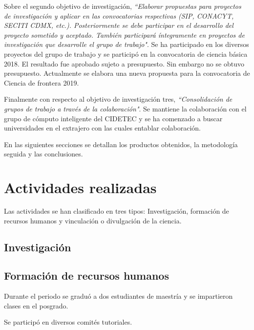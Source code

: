 \documentclass[]{article}
\begin{document}
Sobre el segundo objetivo de investigación, \textit{``Elaborar propuestas para proyectos de investigación y aplicar en las convocatorias respectivas (SIP, CONACYT, SECITI CDMX, etc.). Posteriormente se debe participar en el desarrollo del proyecto sometido y aceptado. También participará íntegramente en proyectos de investigación que desarrolle el grupo de trabajo"}\cite{anexo2actualizado}.  Se ha participado en los diversos proyectos del grupo de trabajo y se participó en la convocatoria de ciencia básica 2018. El resultado fue aprobado sujeto a presupuesto. Sin embargo no se obtuvo presupuesto. Actualmente se elabora una nueva propuesta para la convocatoria de Ciencia de frontera 2019.

Finalmente con respecto al objetivo de investigación tres, \textit{``Consolidación de grupos de trabajo a través de la colaboración"}\cite{anexo2actualizado}. Se mantiene la colaboración con el grupo de cómputo inteligente del CIDETEC y se ha comenzado a buscar universidades en el extrajero con las cuales entablar colaboración. 

En las siguientes secciones se detallan los productos obtenidos, la metodología seguida y las conclusiones.


\section{Actividades realizadas}
\label{sec:actividades}
	


Las actividades se han clasificado en tres tipos: Investigación, formación de recursos humanos y vinculación o divulgación de la ciencia.
	
\subsection{Investigación}
	




\subsection{Formación de recursos humanos}

Durante el periodo se graduó a dos estudiantes de maestría y se impartieron clases en el posgrado.

 Se participó en diversos comités tutoriales.
\end{document}
